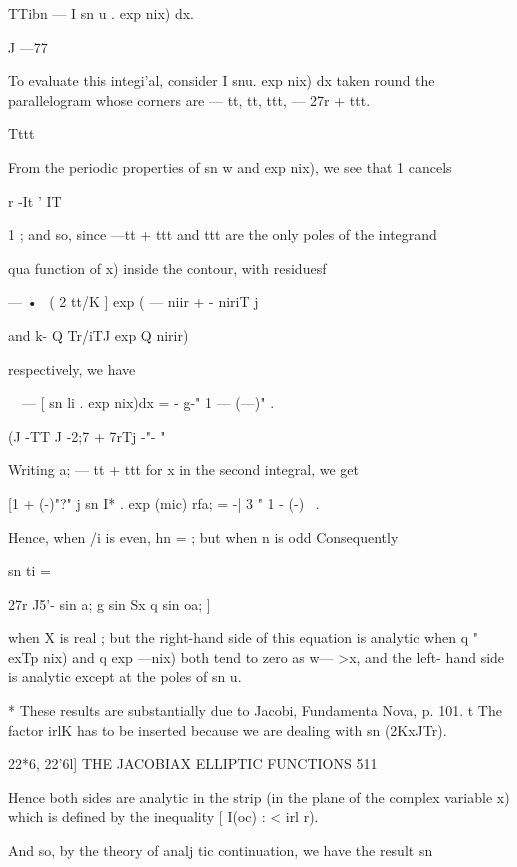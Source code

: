 TTibn — I sn u . exp  nix) dx. 

J —77 

To evaluate this integi'al, consider I snu. exp  nix) dx taken round the 
parallelogram whose corners are — tt, tt, ttt, — 27r + ttt. 

Tttt 

From the periodic properties of sn w and exp  nix), we see that 1 cancels 

r -It ' IT 

1 ; and so, since —tt +  ttt and   ttt are the only poles of the integrand 

 qua function of x) inside the contour, with residuesf 

—  •~  ( 2 tt/K ] exp ( — niir + - niriT j 

and k-  Q Tr/iTJ exp Q nirir) 

respectively, we have 

\ \  — [ sn li . exp  nix)dx = -  g-"  1 — (—)"  . 

(J -TT J -2;7 + 7rTj -"- " 

Writing a; — tt + ttt for x in the second integral, we get 

[1 + (-)"?"  j sn I* . exp (mic) rfa; =  -| 3 "   1 - (-)~ . 



Hence, when /i is even, hn = ; but when n is odd 
Consequently 






sn ti = 



27r J5'- sin a; g  sin Sx q  sin oa; ] 



when X is real ; but the right-hand side of this equation is analytic when 
q "  exTp  nix) and q  exp  —nix) both tend to zero as w— >x, and the left- 
hand side is analytic except at the poles of sn u. 

* These results are substantially due to Jacobi, Fundamenta Nova, p. 101. 
t The factor  irlK has to be inserted because we are dealing with sn (2KxJTr). 



22*6, 22'6l] THE JACOBIAX ELLIPTIC FUNCTIONS 511 

Hence both sides are analytic in the strip (in the plane of the complex 
variable x) which is defined by the inequality [ I(oc) : < irl  r). 



And so, by the theory of analj tic continuation, we have the result 
sn 



